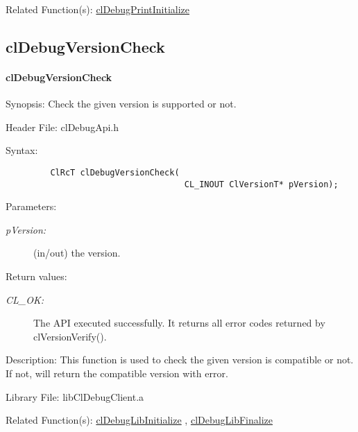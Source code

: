 \begin{Desc}
\item[Related Function(s):]\hyperlink{pagedbg106}{cl\-Debug\-Print\-Initialize} \end{Desc}
\begin{Desc}

\newpage

\subsection{clDebugVersionCheck}
\hypertarget{pageDbg109}{}\paragraph{cl\-Debug\-Version\-Check}\label{pageDbg109}
\item[Synopsis:]Check the given version is supported or not.\end{Desc}
\begin{Desc}
\item[Header File:]clDebugApi.h\end{Desc}
\begin{Desc}
\item[Syntax:]

\footnotesize\begin{verbatim}         ClRcT clDebugVersionCheck(
                          			CL_INOUT ClVersionT* pVersion);
\end{verbatim}
\normalsize
\end{Desc}
\begin{Desc}
\item[Parameters:]
\begin{description}
\item[{\em p\-Version:}](in/out) the version.\end{description}
\end{Desc}
\begin{Desc}
\item[Return values:]
\begin{description}
\item[{\em CL\_\-OK:}]The API executed successfully. It returns all error codes returned by cl\-Version\-Verify().\end{description}
\end{Desc}
\begin{Desc}
\item[Description:]This function is used to check the given version is compatible or not. If not, will return the compatible version with error.\end{Desc}
\begin{Desc}
\item[Library File:]lib\-Cl\-Debug\-Client.a\end{Desc}
\begin{Desc}
\item[Related Function(s):]\hyperlink{pagedbg102}{cl\-Debug\-Lib\-Initialize} , \hyperlink{pagedbg103}{cl\-Debug\-Lib\-Finalize} \end{Desc}

